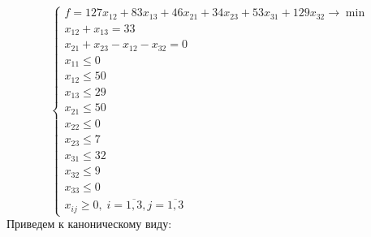 \documentclass[a4paper]{article}
\theoremstyle{definition}
\theoremstyle{remark}
\begin{document}
\[\begin{cases}
		f = 127 x_{12} + 83 x_{13} + 46 x_{21} + 34 x_{23} + 53 x_{31} + 129 x_{32} \to \min \\
		x_{12}+x_{13} = 33                                                                   \\
		x_{21} + x_{23} - x_{12} - x_{32} = 0                                                \\
		x_{11}\leqslant 0                                                                    \\
		x_{12}\leqslant 50                                                                   \\
		x_{13}\leqslant 29                                                                   \\
		x_{21}\leqslant 50                                                                   \\
		x_{22}\leqslant 0                                                                    \\
		x_{23}\leqslant 7                                                                    \\
		x_{31}\leqslant 32                                                                   \\
		x_{32}\leqslant 9                                                                    \\
		x_{33}\leqslant 0                                                                    \\
		x_{ij} \geqslant 0, \; i = \overline{1, 3}, j = \overline{1, 3}
	\end{cases}\]
Приведем к каноническому виду:
\end{document}

